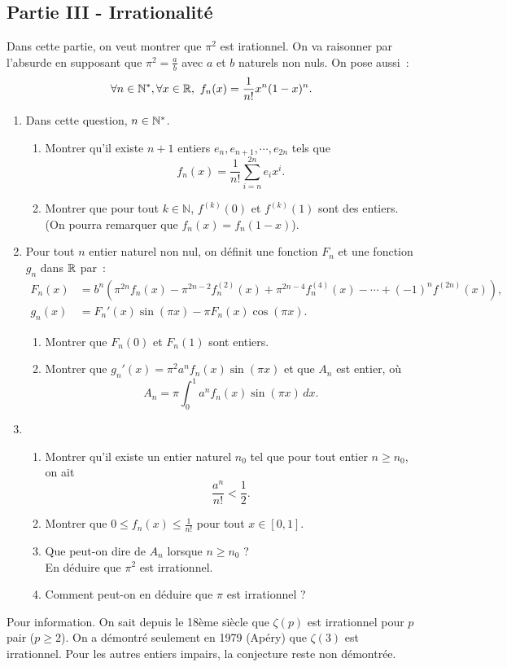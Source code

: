 \subsection*{Partie III - Irrationalité}
Dans cette partie, on veut montrer que $\pi^2$ est irationnel. On va raisonner par l'absurde en supposant que $\displaystyle \pi^2=\frac{a}{b}$ avec $a$ et $b$ naturels non nuls. On pose aussi~:
\begin{displaymath}
 \forall n\in \N^*, \forall x\in \R, \ 
f_n(x)=\frac{1}{n!}x^n(1-x)^n.
\end{displaymath}
\begin{enumerate}
 \item Dans cette question, $n\in \mathbb{N}^*$.
\begin{enumerate}
 \item Montrer qu'il existe $n+1$ entiers $e_n, e_{n+1},\cdots,e_{2n}$ tels que \[f_n(x)=\frac{1}{n!}\sum\limits_{i=n}^{2n}e_ix^i.\]
 \item Montrer que pour tout $k \in \mathbb{N}$, $f^{(k)}(0)$ et $f^{(k)}(1)$ sont des entiers. \\ (On pourra remarquer que $f_n(x)=f_n(1-x)$).
\end{enumerate}
 \item Pour tout $n$ entier naturel non nul, on définit une fonction $F_n$ et une fonction $g_n$ dans $\mathbb{R}$ par~:
\begin{align*}
 F_n(x)&=
b^n\left(
\pi^{2n}f_n(x)-\pi^{2n-2}f_n^{(2)}(x)+\pi^{2n-4}f_n^{(4)}(x)- \cdots +(-1)^nf^{(2n)}(x)
 \right), \\
g_n(x) &= F_n'(x)\sin(\pi x)-\pi F_n(x)\cos(\pi x).
\end{align*}
\begin{enumerate}
 \item Montrer que $F_n(0)$ et $F_n(1)$ sont entiers.
 \item Montrer que $g_n'(x)=\pi^2a^nf_n(x)\sin(\pi x)$ et que $A_n$ est entier, où
\begin{displaymath}
 A_n = \pi \int_0^1a^nf_n(x)\sin(\pi x)\,dx.
\end{displaymath}
\end{enumerate}
\item
\begin{enumerate}
 \item Montrer qu'il existe un entier naturel $n_0$ tel que pour tout entier $n \geq n_0$, on ait \[\displaystyle \frac{a^n}{n!}<\frac{1}{2}. \]
 \item Montrer que $\displaystyle0\leq f_n(x)\leq \frac{1}{n!}$ pour tout $x\in[0,1]$.
 \item Que peut-on dire de $A_n$ lorsque $n\geq n_0$ ? \\ En déduire que $\pi^2$ est irrationnel.
 \item Comment peut-on en déduire que $\pi$ est irrationnel ?
\end{enumerate}
\end{enumerate}

\bigskip

\begin{it}Pour information.\newline
On sait depuis le 18ème siècle que $\zeta(p)$ est irrationnel pour $p$ pair ($p \geq 2$). On a démontré seulement en 1979 (Apéry) que $\zeta(3)$ est irrationnel. Pour les autres entiers impairs, la conjecture reste non démontrée.\end{it}